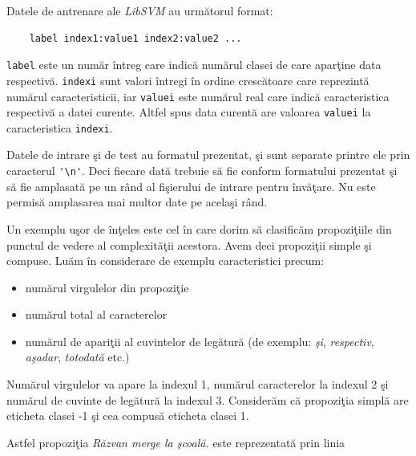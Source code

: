 \documentclass[a4paper,12pt]{report}
\begin{document}
  \par
  Datele de antrenare ale \textit{LibSVM} au urm\u atorul format:
  
  \begin{verbatim}
    label index1:value1 index2:value2 ...
  \end{verbatim}
  
  \verb|label| este un num\u ar \^intreg care indic\u a num\u arul clasei de care apar\c tine data respectiv\u a.
  \verb|indexi| sunt valori \^intregi \^in ordine cresc\u atoare care reprezint\u a num\u arul caracteristicii, iar 
  \verb|valuei| este num\u arul real care indic\u a caracteristica respectiv\u a a datei curente. Altfel spus 
  data curent\u a are valoarea \verb|valuei| la caracteristica \verb|indexi|.
  
  \par
  Datele de intrare \c si de test au formatul prezentat, \c si sunt separate printre ele prin caracterul 
  \verb|'\n'|. Deci fiecare dat\u a trebuie s\u a fie conform formatului prezentat \c si s\u a fie
  amplasat\u a pe un r\^and al fi\c sierului de intrare pentru \^inv\u a\c tare. Nu este permis\u a amplasarea
  mai multor date pe acela\c si r\^and.

  \par
  Un exemplu u\c sor de \^in\c teles este cel \^in care dorim s\u a clasific\u am propozi\c tiile din punctul de vedere al 
  complexit\u a\c tii acestora. Avem deci propozi\c tii simple \c si compuse. Lu\u am \^in considerare de
  exemplu caracteristici precum:
   
  \begin{itemize}
     \item{} num\u arul virgulelor din propozi\c tie
     \item num\u arul total al caracterelor
     \item num\u arul de apari\c tii al cuvintelor de leg\u atur\u a (de exemplu: 
      \textit{\c si}, \textit{respectiv}, \textit{a\c sadar}, \textit{totodat\u a} etc.)
  \end{itemize}
  
  \par
  Num\u arul virgulelor va apare la indexul 1, num\u arul caracterelor la indexul 2 \c si num\u arul 
  de cuvinte de leg\u atur\u a la indexul 3. Consider\u am c\u a propozi\c tia simpl\u a are eticheta clasei 
  -1 \c si cea compus\u a eticheta clasei 1. 
  
  \par
  Astfel propozi\c tia \textit{R\u azvan merge la \c scoal\u a.} este reprezentat\u a prin linia
  
\end{document}
